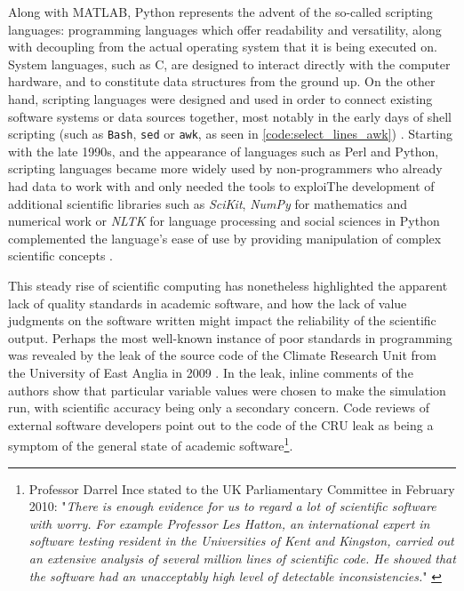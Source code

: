 Along with MATLAB, Python represents the advent of the so-called scripting languages: programming  languages which offer readability and versatility, along with decoupling from the actual operating system that it is being executed on. System languages, such as C, are designed to interact directly with the computer hardware, and to constitute data structures from the ground up. On the other hand, scripting languages were designed and used in order to connect existing software systems or data sources together, most notably in the early days of shell scripting (such as \lstinline{Bash}, \lstinline{sed} or \lstinline{awk}, as seen in \ref{code:select_lines_awk}) \citep{ousterhout_scripting_1998}. Starting with the late 1990s, and the appearance of languages such as Perl and Python, scripting languages became more widely used by non-programmers who already had data to work with and only needed the tools to exploiThe development of additional scientific libraries such as \emph{SciKit}, \emph{NumPy} for mathematics and numerical work or \emph{NLTK} for language processing and social sciences in Python complemented the language's ease of use by providing manipulation of complex scientific concepts \citep{millman_python_2011}.

This steady rise of scientific computing has nonetheless highlighted the apparent lack of quality standards in academic software, and how the lack of value judgments on the software written might impact the reliability of the scientific output\citep{hatton_how_1994}. Perhaps the most well-known instance of poor standards in programming was revealed by the leak of the source code of the Climate Research Unit from the University of East Anglia in 2009 \citep{merali_computational_2010}. In the leak, inline comments of the authors show that particular variable values were chosen to make the simulation run, with scientific accuracy being only a secondary concern. Code reviews of external software developers point out to the code of the CRU leak as being a symptom of the general state of academic software\footnote{Professor Darrel Ince stated to the UK Parliamentary Committee in February 2010: "\emph{There is enough evidence for us to regard a lot of scientific software with worry. For example Professor Les Hatton, an international expert in software testing resident in the Universities of Kent and Kingston, carried out an extensive analysis of several million lines of scientific code. He showed that the software had an unacceptably high level of detectable inconsistencies.}" \citep{committee_disclosure_2010}}.

